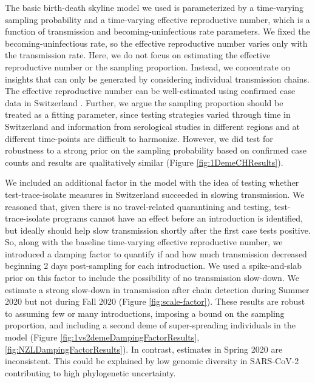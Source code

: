 \documentclass[9pt,twoside,lineno]{pnas-new} %
\begin{document}
The basic birth-death skyline model we used is parameterized by a time-varying sampling probability and a time-varying effective reproductive number, which is a function of transmission and becoming-uninfectious rate parameters. We fixed the becoming-uninfectious rate, so the effective reproductive number varies only with the transmission rate. Here, we do not focus on estimating the effective reproductive number or the sampling proportion. Instead, we concentrate on insights that can only be generated by considering individual transmission chains. The effective reproductive number can be well-estimated using confirmed case data in Switzerland \cite{shinyRe}. Further, we argue the sampling proportion should be treated as a fitting parameter, since testing strategies varied through time in Switzerland and information from serological studies in different regions and at different time-points are difficult to harmonize. However, we did test for robustness to a strong prior on the sampling probability based on confirmed case counts and results are qualitatively similar (Figure \ref{fig:1DemeCHResults}).

We included an additional factor in the model with the idea of testing whether test-trace-isolate measures in Switzerland succeeded in slowing transmission. We reasoned that, given there is no travel-related quarantining and testing, test-trace-isolate programs cannot have an effect before an introduction is identified, but ideally should help slow transmission shortly after the first case tests positive. So, along with the baseline time-varying effective reproductive number, we introduced a damping factor to quantify if and how much transmission decreased beginning 2 days post-sampling for each introduction.  We used a spike-and-slab prior on this factor to include the possibility of no transmission slow-down. We estimate a strong slow-down in transmission after chain detection during Summer 2020 but not during Fall 2020 (Figure \ref{fig:scale-factor}). These results are robust to assuming few or many introductions, imposing a bound on the sampling proportion, and including a second deme of super-spreading individuals in the model (Figure \ref{fig:1vs2demeDampingFactorResults}, \ref{fig:NZLDampingFactorResults}). In contrast, estimates in Spring 2020 are inconsistent. This could be explained by low genomic diversity in SARS-CoV-2 contributing to high phylogenetic uncertainty.
\end{document}
